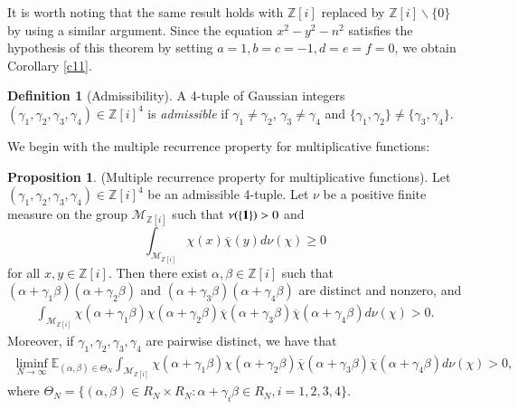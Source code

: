 \documentclass[12pt,amstex]{amsart}
\theoremstyle{definition}
\newtheorem{defn}[thm]{Definition}
\newtheorem{prop}[thm]{Proposition}
\def \Z {\mathbb{Z}[i]}
\def \A {\alpha}
\def \B {\beta}
\def \C {\gamma}
\begin{document}
It is worth noting that the same result holds with $\Z$ replaced by $\Z\backslash \{0\}$ by using a similar argument.
Since the equation $x^{2}-y^{2}-n^{2}$ satisfies the hypothesis of this theorem by setting $a=1,b=c=-1,d=e=f=0$, we obtain Corollary \ref{c11}.

\begin{defn}[Admissibility]
 A 4-tuple of Gaussian integers $(\C_{1},\C_{2},\C_{3},\C_{4})\in\Z^{4}$ is \emph{admissible} if $\C_{1}\neq \C_{2}$, $\C_{3}\neq \C_{4}$ and $\{\C_{1},\C_{2}\}\neq \{\C_{3},\C_{4}\}$.
\end{defn}
We begin with the multiple recurrence property for multiplicative functions:

\begin{prop}\label{c4}(Multiple recurrence property for multiplicative functions).
  Let $(\C_{1},\C_{2},\C_{3},\C_{4})\in\Z^{4}$ be an admissible 4-tuple. Let $\nu$ be a positive finite measure on the group $\mathcal{M}_{\Z}$ such that $\nu(\{\bold{1}\})>0$ and
       $$\int_{\mathcal{M}_{\Z}}\chi(x)\overline{\chi}(y)d\nu(\chi)\geq 0$$ 
for all $x,y\in \Z$. 
 Then there exist $\A,\B\in\Z$ such that
  $(\A+\C_{1}\B)(\A+\C_{2}\B)$ and $(\A+\C_{3}\B)(\A+\C_{4}\B)$ are distinct and nonzero, and
    \begin{equation}\nonumber
  \begin{split}
    \int_{\mathcal{M}_{\Z}}{\chi(\A+\C_{1}\B)\chi(\A+\C_{2}\B)\overline{\chi}(\A+\C_{3}\B)
    \overline{\chi}(\A+\C_{4}\B)}d\nu(\chi)>0.
  \end{split}
  \end{equation}
  Moreover, if $\C_{1},\C_{2},\C_{3},\C_{4}$ are pairwise distinct, we have that
  \begin{equation}\label{temp9}
  \begin{split}
    \liminf_{N\rightarrow\infty}\mathbb{E}_{(\A,\B)\in\Theta_{N}}\int_{\mathcal{M}_{\Z}}{\chi(\A+\C_{1}\B)\chi(\A+\C_{2}\B)\overline{\chi}(\A+\C_{3}\B)
    \overline{\chi}(\A+\C_{4}\B)}d\nu(\chi)>0,
  \end{split}
  \end{equation}
  where $\Theta_{N}=\{(\A,\B)\in R_{N}\times  R_{N}\colon \A+\C_{i}\B\in R_{N}, i=1,2,3,4\}$.
\end{prop}
\end{document}
